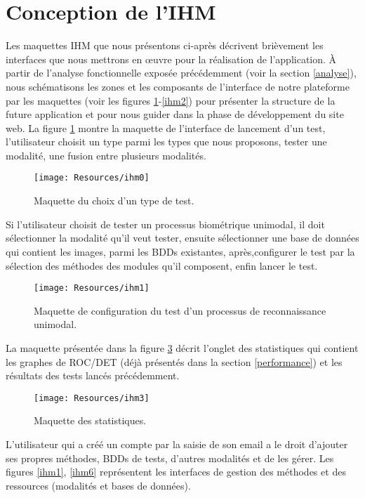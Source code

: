 \section{Conception de l'IHM}
Les maquettes IHM que nous présentons ci-après décrivent brièvement les interfaces que nous mettrons en œuvre pour la réalisation de l’application.
À partir de l'analyse fonctionnelle exposée précédemment (voir la section \ref{analyse}), nous schématisons les zones et les composants de l'interface de notre plateforme par les maquettes (voir les figures \ref{ihm0}-\ref{ihm2}) pour présenter la structure de la future application et pour nous guider dans la phase de développement du site web. La figure \ref{ihm0} montre la maquette de l'interface de lancement d'un test, l'utilisateur choisit un type parmi les types que nous proposons, tester une modalité, une fusion entre plusieurs modalités.



\begin{figure}[H]
	\centering
	\texttt{[image: Resources/ihm0]}
	\caption{Maquette du choix d'un type de test. }
	\label{ihm0}
\end{figure}

Si l'utilisateur choisit de tester un processus biométrique unimodal, il doit sélectionner la modalité qu'il veut tester, ensuite sélectionner une base de données qui contient les images, parmi les BDDs existantes, après,configurer le test par la sélection des méthodes des modules qu'il composent, enfin lancer le test.


\begin{figure}[H]
	\centering
	\texttt{[image: Resources/ihm1]}
	\caption{Maquette de configuration du test d'un processus de reconnaissance unimodal. }
	\label{ihm4}
\end{figure}
La maquette présentée dans la figure \ref{ihm3} décrit l'onglet des statistiques qui contient les graphes de ROC/DET (déjà présentés dans la section \ref{performance}) et les résultats des tests lancés précédemment.

\begin{figure}[H]
	\centering
	\texttt{[image: Resources/ihm3]}
	\caption{Maquette des statistiques. }
	\label{ihm3}
\end{figure}

L'utilisateur qui a créé un compte par la saisie de son email a le droit d'ajouter ses propres méthodes, BDDs de tests, d'autres modalités et de les gérer. Les figures \ref{ihm1}, \ref{ihm6} représentent les interfaces de gestion des méthodes et des ressources (modalités et bases de données). 

